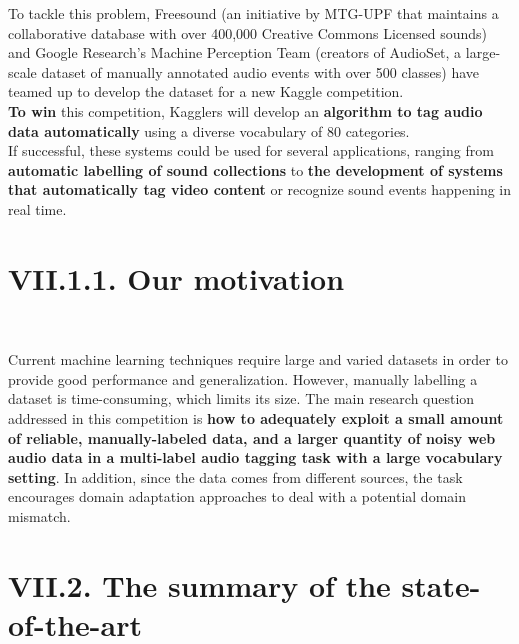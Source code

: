 \documentclass[11pt, a4papper]{report}
\theoremstyle{plain}
\theoremstyle{definition}
\theoremstyle{definition}
\theoremstyle{proposition}
\begin{document}
To tackle this problem, Freesound (an initiative by MTG-UPF that maintains a collaborative database with over 400,000 Creative Commons Licensed sounds) and Google Research’s Machine Perception Team (creators of AudioSet, a large-scale dataset of manually annotated audio events with over 500 classes) have teamed up to develop the dataset for a new Kaggle competition.
\\

\textbf{To win} this competition, Kagglers will develop an \textbf{algorithm to tag audio data automatically} using a diverse vocabulary of 80 categories.
\\

If successful, these systems could be used for several applications, ranging from \textbf{automatic labelling of sound collections} to \textbf{the development of systems that automatically tag video content} or recognize sound events happening in real time.

\section*{VII.1.1. Our motivation}
\

Current machine learning techniques require large and varied datasets in order to provide good performance and generalization. However, manually labelling a dataset is time-consuming, which limits its size. The main research question addressed in this competition is \textbf{how to adequately exploit a small amount of reliable, manually-labeled data, and a larger quantity of noisy web audio data in a multi-label audio tagging task with a large vocabulary setting}. In addition, since the data comes from different sources, the task encourages domain adaptation approaches to deal with a potential domain mismatch.

\section*{VII.2. The summary of the state-of-the-art}
\
\end{document}
